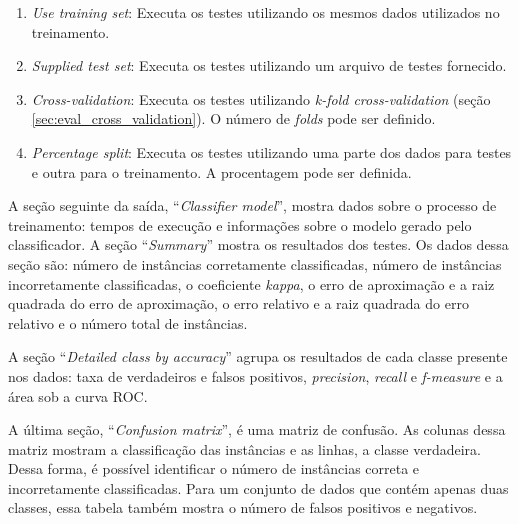 \begin{enumerate}
    \item \emph{Use training set}: Executa os testes utilizando os mesmos dados utilizados no treinamento.
    \item \emph{Supplied test set}: Executa os testes utilizando um arquivo de testes fornecido.
    \item \emph{Cross-validation}: Executa os testes utilizando \emph{\emph{k}-fold cross-validation} (seção \ref{sec:eval_cross_validation}). O número de \emph{folds} pode ser definido.
    \item \emph{Percentage split}: Executa os testes utilizando uma parte dos dados para testes e outra para o treinamento. A procentagem pode ser definida.
\end{enumerate}

A seção seguinte da saída, ``\emph{Classifier model}'', mostra dados sobre o processo de treinamento: tempos de execução e informações sobre o modelo gerado pelo classificador. A seção ``\emph{Summary}'' mostra os resultados dos testes. Os dados dessa seção são: número de instâncias corretamente classificadas, número de instâncias incorretamente classificadas, o coeficiente \emph{kappa}, o erro de aproximação e a raiz quadrada do erro de aproximação, o erro relativo e a raiz quadrada do erro relativo e o número total de instâncias.

A seção ``\emph{Detailed class by accuracy}'' agrupa os resultados de cada classe presente nos dados: taxa de verdadeiros e falsos positivos, \emph{precision}, \emph{recall} e \emph{f-measure} e a área sob a curva ROC.

A última seção, ``\emph{Confusion matrix}'', é uma matriz de confusão. As colunas dessa matriz mostram a classificação das instâncias e as linhas, a classe verdadeira. Dessa forma, é possível identificar o número de instâncias correta e incorretamente classificadas. Para um conjunto de dados que contém apenas duas classes, essa tabela também mostra o número de falsos positivos e negativos.

